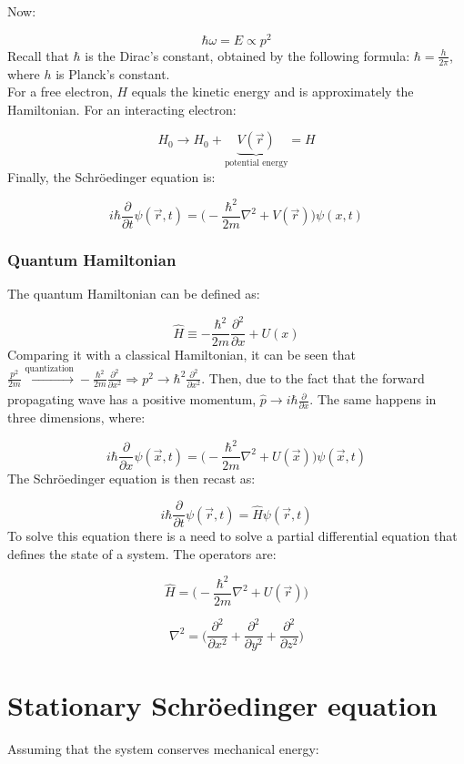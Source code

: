   Now:

  $$\hbar\omega = E \propto p^2$$
Recall that $\hbar$ is the Dirac's constant, obtained by the following formula: $\hbar=\frac{h}{2\pi}$, where $h$ is Planck's constant.\\
\noindent
  For a free electron, $H$ equals the kinetic energy and is approximately the Hamiltonian.
  For an interacting electron:

  $$H_0 \rightarrow H_0 + \underbrace{V(\vec{r})}_{\text{potential energy}} = H$$
\noindent
  Finally, the Schr\"oedinger equation is:

  $$i\hbar \frac{\partial {}}{\partial {t}}\psi(\vec{r},t) = \biggl(-\frac{\hbar^2}{2m}\nabla^2+V(\vec{r})\biggr)\psi(x,t)$$

    \subsubsection{Quantum Hamiltonian}
    The quantum Hamiltonian can be defined as:

    $$\hat{H} \equiv -\frac{\hbar^2}{2m}\frac{\partial^2}{\partial x}+U(x)$$
\noindent
    Comparing it with a classical Hamiltonian, it can be seen that $\frac{p^2}{2m}\xrightarrow[]{\text{quantization}} - \frac{\hbar^2}{2m}\frac{\partial^2}{\partial x^2}\Rightarrow p^2\rightarrow \hbar^2\frac{\partial^2}{\partial x^2}$.
    Then, due to the fact that the forward propagating wave has a positive momentum, $\hat{p}\rightarrow i\hbar\frac{\partial}{\partial x}$.
    The same happens in three dimensions, where:

    $$i\hbar\frac{\partial }{\partial x}\psi(\vec{x}, t) = \biggl(-\frac{\hbar^2}{2m}\nabla^2+U(\vec{x})\biggr)\psi(\vec{x},t)$$
\noindent
    The Schr\"oedinger equation is then recast as:

    $$i\hbar \frac{\partial {}}{\partial {t}}\psi(\vec{r},t) = \hat{H} \psi(\vec{r},t)$$
\noindent
    To solve this equation there is a need to solve a partial differential equation that defines the state of a system.
    The operators are:

    $$\hat{H} = \biggl(-\frac{\hbar^2}{2m}\nabla^2+U(\vec{r})\biggr)$$

    $$\nabla^2 = \biggl(\frac{\partial^2}{\partial x^2} +\frac{\partial^2}{\partial y^2} + \frac{\partial^2}{\partial z^2}\biggr)$$

\section{Stationary Schr\"oedinger equation}
Assuming that the system conserves mechanical energy:

